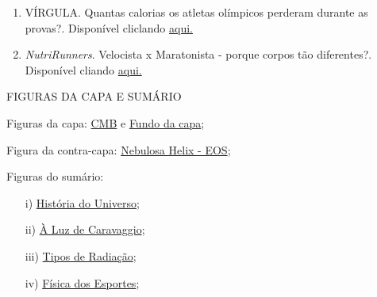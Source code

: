 \artigoquatro
\begin{enumerate}
    \item \label{ref1:artigo4} VÍRGULA. Quantas calorias os atletas olímpicos perderam durante as provas?. Disponível cliclando \href{https://www.virgula.com.br/saude/quantas-calorias-os-atletas-olimpicos-perderam-durante-as-provas-nos-te-contamos/}{aqui.}
    \item \label{ref2:artigo4} \textit{NutriRunners}. Velocista x Maratonista - porque corpos tão diferentes?. Disponível cliando \href{https://www.youtube.com/watch?v=kQ7VOb-yzgg}{aqui.}
\end{enumerate}

\begin{center}
    \textcolor{base}{\MakeUppercase{Figuras da Capa e Sumário}}
\end{center}

Figuras da capa: \href{https://www.britannica.com/science/cosmic-microwave-background}{CMB} e \href{https://www.canva.com/}{Fundo da capa};

Figura da contra-capa: \href{https://www.eso.org/public/images/eso1205a/}{Nebulosa Helix - EOS};

Figuras do sumário:

\begin{itemize}
    \item[i)] \href{https://www.sciencephoto.com/media/334059/view}{História do Universo};
    \item[ii)] \href{https://www.wikiart.org/pt/caravaggio}{À Luz de Caravaggio};
    \item[iii)] \href{https://radioprotecaonapratica.com.br/voce-sabe-o-que-e-radiacao/}{Tipos de Radiação};
    \item[iv)] \href{https://www2.ifsc.usp.br/portal-ifsc/a-fisica-no-esporte/}{Física dos Esportes};
\end{itemize}




